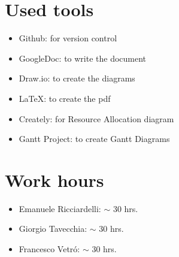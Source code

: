 \documentclass[10pt, a4paper,titlepage]{article}
\begin{document}
\section*{Used tools}
\begin{itemize}
\item Github: for version control
\item GoogleDoc: to write the document
\item Draw.io: to create the diagrams
\item \LaTeX: to create the pdf
\item Creately: for Resource Allocation diagram
\item Gantt Project: to create Gantt Diagrams
\end{itemize}
\section*{Work hours} 
\begin{itemize}
\item Emanuele Ricciardelli: $\sim$ 30 hrs.
\item Giorgio Tavecchia: $\sim$ 30 hrs.
\item Francesco Vetr\'o: $\sim$ 30 hrs.
\end{itemize}
\end{document}
